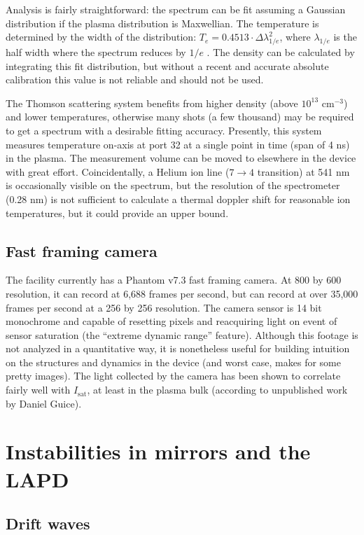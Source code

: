 Analysis is fairly straightforward: the spectrum can be fit assuming a Gaussian distribution if the plasma distribution is Maxwellian. The temperature is determined by the width of the distribution: $T_e = 0.4513 \cdot \Delta \lambda_{1/e}^2$, where $\lambda_{1/e}$ is the half width where the spectrum reduces by $1/e$ \cite{ghazaryan_thomson_2022}. The density can be calculated by integrating this fit distribution, but without a recent and accurate absolute calibration this value is not reliable and should not be used.

The Thomson scattering system benefits from higher density (above $10^{13}$ cm$^{-3}$) and lower temperatures, otherwise many shots (a few thousand) may be required to get a spectrum with a desirable fitting accuracy. Presently, this system measures temperature on-axis at port 32 at a single point in time (span of 4 ns) in the plasma. The measurement volume can be moved to elsewhere in the device with great effort. Coincidentally, a Helium ion line ($7 \rightarrow 4$ transition) at 541 nm is occasionally visible on the spectrum, but the resolution of the spectrometer (0.28 nm) is not sufficient to calculate a thermal doppler shift for reasonable ion temperatures, but it could provide an upper bound.

\subsection{Fast framing camera}

The facility currently has a Phantom v7.3 fast framing camera. At 800 by 600 resolution, it can record at 6,688 frames per second, but can record at over 35,000 frames per second at a 256 by 256 resolution. The camera sensor is 14 bit monochrome and capable of resetting pixels and reacquiring light on event of sensor saturation (the ``extreme dynamic range'' feature). Although this footage is not analyzed in a quantitative way, it is nonetheless useful for building intuition on the structures and dynamics in the device (and worst case, makes for some pretty images). The light collected by the camera has been shown to correlate fairly well with $I_\text{sat}$, at least in the plasma bulk (according to unpublished work by Daniel Guice). 

\section{Instabilities in mirrors and the LAPD}

\subsection{Drift waves}

